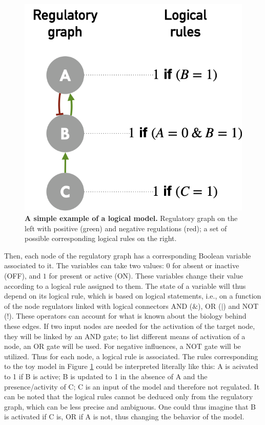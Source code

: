 \documentclass[a4paper,12pt,twoside,onecolumn,openright,final,oldfontcommands]{memoir}
\begin{document}
\begin{figure}

{\centering \includegraphics[width=0.5\linewidth]{fig/logical} 

}

\caption[A simple example of a logical model]{\textbf{A simple example of a logical model.}
Regulatory graph on the left with positive (green) and negative
regulations (red); a set of possible corresponding logical rules on the
right.}\label{fig:logical}
\end{figure}






Then, each node of the regulatory graph has a corresponding Boolean
variable associated to it. The variables can take two values: \(0\) for
absent or inactive (OFF), and \(1\) for present or active (ON). These
variables change their value according to a logical rule assigned to
them. The state of a variable will thus depend on its logical rule,
which is based on logical statements, i.e., on a function of the node
regulators linked with logical connectors AND (\(\&\)), OR (\(|\)) and
NOT (\(!\)). These operators can account for what is known about the
biology behind these edges. If two input nodes are needed for the
activation of the target node, they will be linked by an AND gate; to
list different means of activation of a node, an OR gate will be used.
For negative influences, a NOT gate will be utilized. Thus for each
node, a logical rule is associated. The rules corresponding to the toy
model in Figure \ref{fig:logical} could be interpreted literally like
this: A is acivated to 1 if B is active; B is updated to 1 in the
absence of A and the presence/activity of C; C is an input of the model
and therefore not regulated. It can be noted that the logical rules
cannot be deduced only from the regulatory graph, which can be less
precise and ambiguous. One could thus imagine that B is activated if C
is, OR if A is not, thus changing the behavior of the model.
\end{document}
